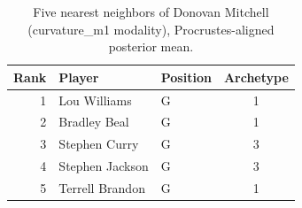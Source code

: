 \begin{table}[htbp]
  \centering\small
  \begin{tabular}{rllc}
    \toprule
    Rank & Player & Position & Archetype \\
    \midrule
    1 & Lou Williams & G & 1 \\
    2 & Bradley Beal & G & 1 \\
    3 & Stephen Curry & G & 3 \\
    4 & Stephen Jackson & G & 3 \\
    5 & Terrell Brandon & G & 1 \\
    \bottomrule
  \end{tabular}
  \caption{Five nearest neighbors of Donovan Mitchell (curvature_m1 modality), Procrustes-aligned posterior mean.}
  \label{tab:Donovan_Mitchell_neighbors_curvature_m1}
\end{table}

